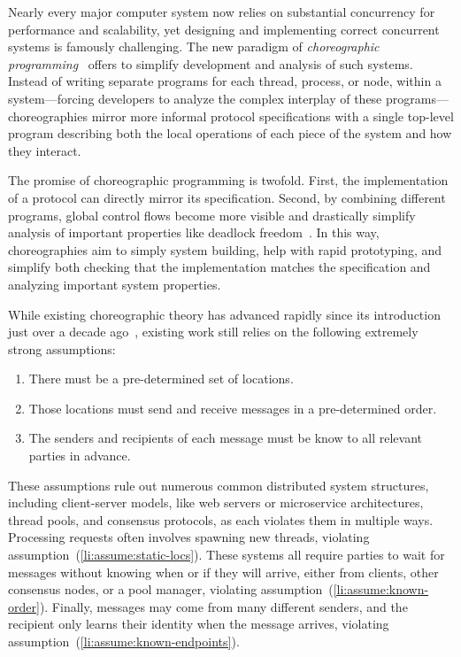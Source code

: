 Nearly every major computer system now relies on substantial concurrency for performance and scalability,
yet designing and implementing correct concurrent systems is famously challenging.
The new paradigm of \emph{choreographic programming}~\citep{Montesi13,Montesi23} offers to simplify development and analysis of such systems.
Instead of writing separate programs for each thread, process, or node, within a system---forcing developers to analyze the complex interplay of these programs---%
choreographies mirror more informal protocol specifications with a single top-level program
describing both the local operations of each piece of the system and how they interact.

The promise of choreographic programming is twofold.
First, the implementation of a protocol can directly mirror its specification.
Second, by combining different programs, global control flows become more visible
and drastically simplify analysis of important properties like deadlock freedom~\citep{CarboneM13}.
In this way, choreographies aim to simply system building, help with rapid prototyping,
and simplify both checking that the implementation matches the specification
and analyzing important system properties.

While existing choreographic theory has advanced rapidly since its introduction just over a decade ago~\citep{CarboneM13,HirschG22,CruzFilipeGLMP22,CruzFilipeGLMP23,BatesK+25,SamuelsonHC25},
existing work still relies on the following extremely strong assumptions:
\begin{enumerate}
  \item\label{li:assume:static-locs}
    There must be a pre-determined set of locations.
  \item\label{li:assume:known-order}
    Those locations must send and receive messages in a pre-determined order.
  \item\label{li:assume:known-endpoints}
    The senders and recipients of each message must be know to all relevant parties in advance.
\end{enumerate}

These assumptions rule out numerous common distributed system structures,
including client-server models, like web servers or microservice architectures, thread pools, and consensus protocols, as each violates them in multiple ways.
Processing requests often involves spawning new threads, violating assumption~(\ref{li:assume:static-locs}).
These systems all require parties to wait for messages without knowing when or if they will arrive,
either from clients, other consensus nodes, or a pool manager, violating assumption~(\ref{li:assume:known-order}).
Finally, messages may come from many different senders, and the recipient only learns their identity when the message arrives,
violating assumption~(\ref{li:assume:known-endpoints}).

